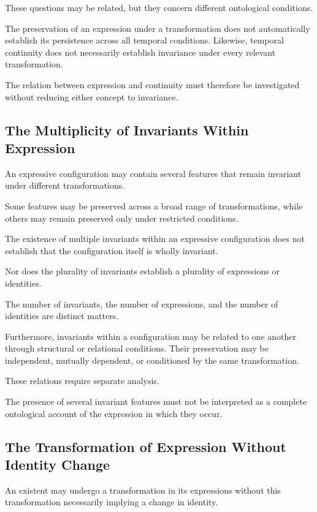 These questions may be related, but they concern
different ontological conditions.

The preservation of an expression under a
transformation does not automatically establish
its persistence across all temporal conditions.
Likewise, temporal continuity does not necessarily
establish invariance under every relevant
transformation.

The relation between expression and continuity
must therefore be investigated without reducing
either concept to invariance.

\subsection{The Multiplicity of Invariants Within Expression}

An expressive configuration may contain several
features that remain invariant under different
transformations.

Some features may be preserved across a broad
range of transformations, while others may remain
preserved only under restricted conditions.

The existence of multiple invariants within an
expressive configuration does not establish
that the configuration itself is wholly invariant.

Nor does the plurality of invariants establish
a plurality of expressions or identities.

The number of invariants, the number of expressions,
and the number of identities are distinct matters.

Furthermore, invariants within a configuration
may be related to one another through structural
or relational conditions. Their preservation
may be independent, mutually dependent, or
conditioned by the same transformation.

These relations require separate analysis.

The presence of several invariant features must
not be interpreted as a complete ontological
account of the expression in which they occur.

\subsection{The Transformation of Expression Without Identity Change}

An existent may undergo a transformation in
its expressions without this transformation
necessarily implying a change in identity.

